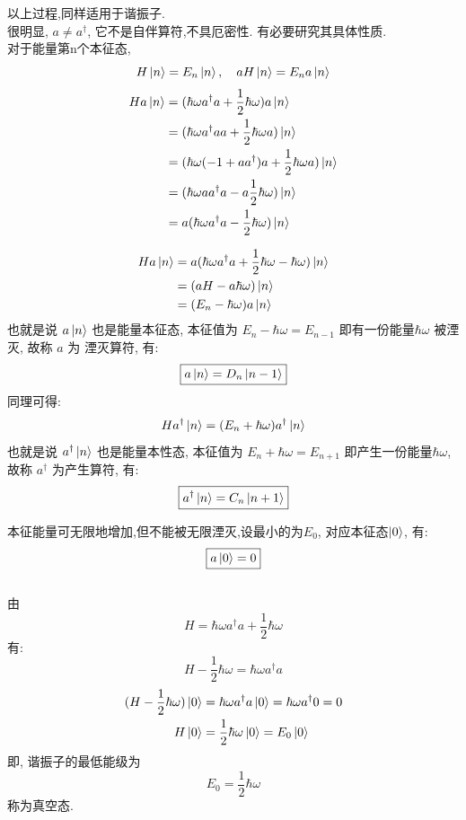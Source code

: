 以上过程,同样适用于谐振子. \\ 

很明显, $ a \not =  a^\dagger $, 它不是自伴算符,不具厄密性. 有必要研究其具体性质.\\ 
对于能量第n个本征态,  
  \[ H  \left|n\right\rangle = E_n  \left|n\right\rangle, \quad  aH  \left|n\right\rangle =E_n a \left|n\right\rangle\]
  \[
  \begin{aligned}
        H a \left|n\right\rangle &= ( \hbar \omega a ^\dagger a + \frac{1}{2}\hbar \omega )a \left|n\right\rangle \\ 
        &=  ( \hbar \omega  a ^\dagger a a  + \frac{1}{2}\hbar \omega a ) \left|n\right\rangle \\ 
        &=  ( \hbar \omega  (-1+a a ^\dagger )a + \frac{1}{2}\hbar \omega a ) \left|n\right\rangle \\ 
        &=  ( \hbar \omega  a a ^\dagger a -  a \frac{1}{2}\hbar \omega ) \left|n\right\rangle \\ 
        &=  a( \hbar \omega   a ^\dagger a -  \frac{1}{2}\hbar \omega ) \left|n\right\rangle 
  \end{aligned}
  \]

  \[ 
  \begin{aligned}
    H a \left|n\right\rangle  &=  a( \hbar \omega   a ^\dagger a +  \frac{1}{2}\hbar \omega  - \hbar \omega ) \left|n\right\rangle \\ 
        &=  (aH - a \hbar \omega ) \left|n\right\rangle \\ 
        &=  (E_n -  \hbar \omega ) a\left|n\right\rangle \\ 
  \end{aligned}
  \]
  也就是说 $a \left|n\right\rangle $ 也是能量本征态, 本征值为 $E_n -  \hbar \omega = E_{n-1} $ 即有一份能量$ \hbar \omega $ 被湮灭, 故称 $a$ 为 湮灭算符, 有: 
  \[ \boxed{a \left|n\right\rangle= D_n\left|n-1\right\rangle} \]
同理可得: 
\[  H a^\dagger \left|n\right\rangle  =  (E_n +  \hbar \omega ) a^\dagger \left|n\right\rangle \]
也就是说 $a^\dagger\left|n\right\rangle $ 也是能量本性态, 本征值为 $E_n + \hbar \omega = E_{n+1} $ 即产生一份能量$ \hbar \omega $, 故称 $a^\dagger$ 为产生算符, 有: 
\[ \boxed{a^\dagger \left|n\right\rangle= C_n \left|n+1\right\rangle} \]

本征能量可无限地增加,但不能被无限湮灭,设最小的为$E_0$, 对应本征态$\left|0\right\rangle$, 有:
\[ \boxed{a \left|0\right\rangle= 0 }\]
~~\\ 
由 \[H=\hbar \omega a ^\dagger a + \frac{1}{2}\hbar \omega\]  
有: 
\[H-\frac{1}{2}\hbar \omega=\hbar \omega a ^\dagger a \] 
\[ 
\begin{aligned}
(H-\frac{1}{2}\hbar \omega) \left|0\right\rangle &= \hbar \omega a ^\dagger a \left|0\right\rangle = \hbar \omega a ^\dagger 0 = 0 \\ 
H \left|0\right\rangle &= \frac{1}{2}\hbar \omega \left|0\right\rangle=E_0 \left|0\right\rangle 
\end{aligned}
\] 
即, 谐振子的最低能级为
\[ \boxed{E_0=\dfrac{1}{2}\hbar \omega} \]
称为真空态.\\ 


